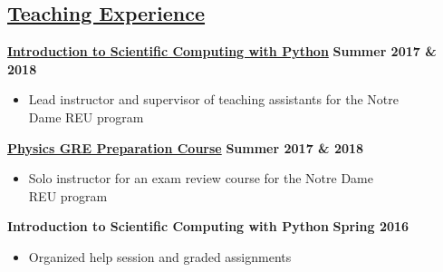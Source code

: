 \documentclass[margin]{res}
\begin{document}
\begin{resume}
\section{\href{https://www3.nd.edu/~brose3/\#classes}{Teaching Experience}}\label{teaching}
\textbf{\href{https://www3.nd.edu/~brose3/2017reu-cmp}{Introduction to Scientific Computing with Python}} \hfill{} \textbf{Summer 2017 \& 2018}
\begin{itemize}\itemsep -2pt
    \item[] Lead instructor and supervisor of teaching assistants for the Notre \\Dame REU program
    \end{itemize} \vspace{-12pt}
\textbf{\href{https://www3.nd.edu/~brose3/2017reu-gre}{Physics GRE Preparation Course}} \hfill{} \textbf{Summer 2017 \& 2018}
\begin{itemize}\itemsep -2pt
    \item[] Solo instructor for an exam review course for the Notre Dame\\REU program
    \end{itemize} \vspace{-12pt}
\textbf{Introduction to Scientific Computing with Python} \hfill{} \textbf{Spring 2016}
    \begin{itemize}\itemsep -2pt
    \item[] Organized help session and graded assignments
    \end{itemize} \vspace{-12pt}

\end{resume}
\end{document}
